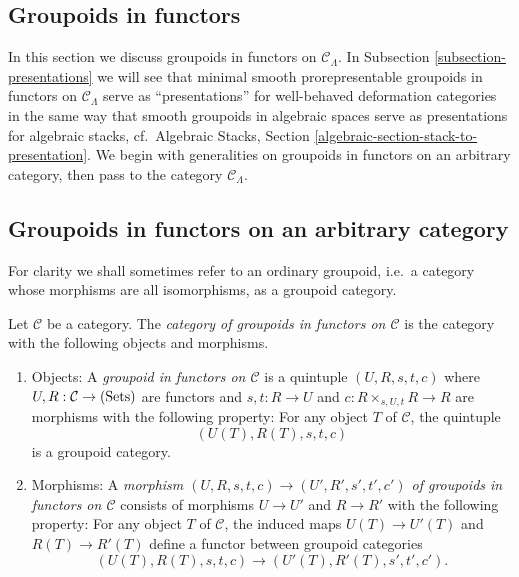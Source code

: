 \subsection{Groupoids in functors}
\label{subsection-groupoids-in-functors}

\noindent
In this section we discuss groupoids in functors on $\mathcal C_{\Lambda}$. In
Subsection \ref{subsection-presentations}
we will see that minimal smooth 
prorepresentable groupoids in functors on $\mathcal C_{\Lambda}$ serve as 
``presentations'' for well-behaved deformation categories in the same way that 
smooth groupoids in algebraic spaces serve as presentations for algebraic 
stacks,
cf.\ Algebraic Stacks, Section \ref{algebraic-section-stack-to-presentation}.
We begin with generalities 
on groupoids in functors on an arbitrary category, then pass to the category 
$\mathcal C_{\Lambda}$.



\subsection{Groupoids in functors on an arbitrary category}
\label{subsection-groupoids-arbitrary}

\noindent
For clarity we shall sometimes refer to an ordinary groupoid, i.e.\ a category 
whose morphisms are all isomorphisms, as a groupoid category.

\begin{definition}
\label{definition-groupoid-in-functors}
Let $\mathcal C$ be a category. The {\it category of groupoids in functors on 
$\mathcal C$} is the category with the following objects and morphisms.
\begin{enumerate}
\item Objects: A {\it groupoid in functors on $\mathcal C$} is a quintuple 
$(U,R,s,t,c)$ where $U,R: \mathcal C \rightarrow \textnormal{(Sets)}$ are 
functors and $s,t: R \rightarrow U$ and $c: R \times_{s,U,t} R \rightarrow R$ 
are morphisms with the following property: For any object $T$ of $\mathcal C$, 
the quintuple
\[ (U(T), R(T), s,t,c) \]
is a groupoid category.
\item Morphisms: A {\it morphism $(U,R,s,t,c) \rightarrow (U',R',s',t',c')$ of 
groupoids in functors on $\mathcal C$} consists of morphisms $U \rightarrow U'$ 
and $R \rightarrow R'$ with the following property: For any object $T$ of 
$\mathcal C$, the induced maps $U(T) \rightarrow U'(T)$ and $R(T) \rightarrow 
R'(T)$ define a functor between groupoid categories
\[ (U(T), R(T), s,t,c) \rightarrow (U'(T), R'(T), s',t',c') .\] 
\end{enumerate}
\end{definition}

